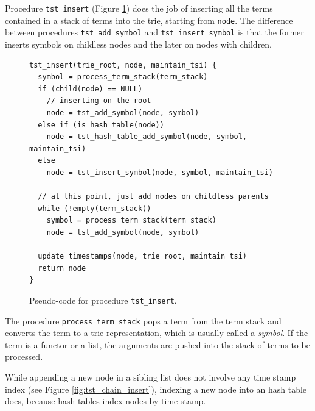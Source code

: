 Procedure \texttt{tst\_insert} (Figure \ref{fig:tst_insert}) does the job of inserting
all the terms contained in a stack of terms into the trie, starting from \texttt{node}.
The difference between procedures \texttt{tst\_add\_symbol} and \texttt{tst\_insert\_symbol}
is that the former inserts symbols on childless nodes and the later on nodes with children.

\begin{figure}[ht]
\begin{Verbatim}
tst_insert(trie_root, node, maintain_tsi) {
  symbol = process_term_stack(term_stack)
  if (child(node) == NULL)
    // inserting on the root
    node = tst_add_symbol(node, symbol)
  else if (is_hash_table(node))
    node = tst_hash_table_add_symbol(node, symbol, maintain_tsi)
  else
    node = tst_insert_symbol(node, symbol, maintain_tsi)
  
  // at this point, just add nodes on childless parents
  while (!empty(term_stack))
    symbol = process_term_stack(term_stack)
    node = tst_add_symbol(node, symbol)
  
  update_timestamps(node, trie_root, maintain_tsi)
  return node
}
\end{Verbatim}
\caption{Pseudo-code for procedure \texttt{tst\_insert}.}
\label{fig:tst_insert}
\end{figure}

The procedure \texttt{process\_term\_stack} pops a term from the term stack and converts the term
to a trie representation, which is usually called a \textit{symbol}. If the term is a functor or a list,
the arguments are pushed into the stack of terms to be processed.

While appending a new node in a sibling list does not involve any
time stamp index (see Figure \ref{fig:tst_chain_insert}), indexing a new node into an hash table does,
because hash tables index nodes by time stamp.

